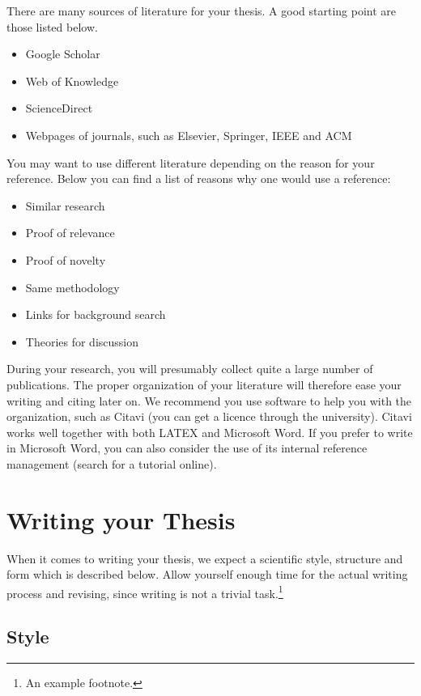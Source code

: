\documentclass{thesisclass}
\begin{document}
There are many sources of literature for your thesis. A good starting point are those listed below. 
\begin{itemize}
	\item Google Scholar
	\item Web of Knowledge
	\item ScienceDirect
	\item Webpages of journals, such as Elsevier, Springer, IEEE and ACM
\end{itemize}
You may want to use different literature depending on the reason for your reference. Below you can find a list of reasons why one would use a reference:
\begin{itemize}
	\item Similar research
	\item Proof of relevance
	\item Proof of novelty
	\item Same methodology
	\item Links for background search
	\item Theories for discussion
\end{itemize}
During your research, you will presumably collect quite a large number of publications. The proper organization of your literature will therefore ease your writing and citing later on. We recommend you use software to help you with the organization, such as Citavi (you can get a licence through the university). Citavi works well together with both LATEX and Microsoft Word. If you prefer to write in Microsoft Word, you can also consider the use of its
internal reference management (search for a tutorial online).

\section{Writing your Thesis }
When it comes to writing your thesis, we expect a scientific style, structure and form which is described below. Allow yourself enough time for the actual writing process and revising, since writing is not a trivial task.\footnote{An example footnote.}

\subsection{Style}
\end{document}
